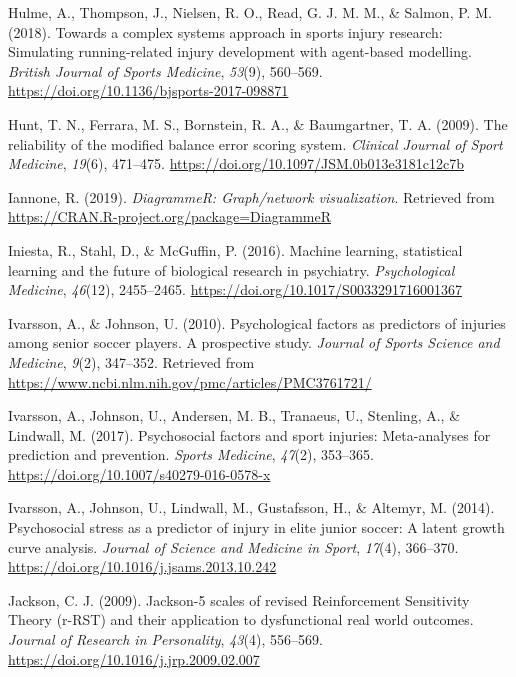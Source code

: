 \documentclass[
  english,
  man,floatsintext]{apa6}
\begin{document}
\leavevmode\hypertarget{ref-Hulme2018}{}%
Hulme, A., Thompson, J., Nielsen, R. O., Read, G. J. M. M., \& Salmon, P. M. (2018). Towards a complex systems approach in sports injury research: Simulating running-related injury development with agent-based modelling. \emph{British Journal of Sports Medicine}, \emph{53}(9), 560--569. \url{https://doi.org/10.1136/bjsports-2017-098871}

\leavevmode\hypertarget{ref-Hunt2009}{}%
Hunt, T. N., Ferrara, M. S., Bornstein, R. A., \& Baumgartner, T. A. (2009). The reliability of the modified balance error scoring system. \emph{Clinical Journal of Sport Medicine}, \emph{19}(6), 471--475. \url{https://doi.org/10.1097/JSM.0b013e3181c12c7b}

\leavevmode\hypertarget{ref-R-DiagrammeR}{}%
Iannone, R. (2019). \emph{DiagrammeR: Graph/network visualization}. Retrieved from \url{https://CRAN.R-project.org/package=DiagrammeR}

\leavevmode\hypertarget{ref-Iniesta2016}{}%
Iniesta, R., Stahl, D., \& McGuffin, P. (2016). Machine learning, statistical learning and the future of biological research in psychiatry. \emph{Psychological Medicine}, \emph{46}(12), 2455--2465. \url{https://doi.org/10.1017/S0033291716001367}

\leavevmode\hypertarget{ref-Ivarsson2010}{}%
Ivarsson, A., \& Johnson, U. (2010). Psychological factors as predictors of injuries among senior soccer players. A prospective study. \emph{Journal of Sports Science and Medicine}, \emph{9}(2), 347--352. Retrieved from \url{https://www.ncbi.nlm.nih.gov/pmc/articles/PMC3761721/}

\leavevmode\hypertarget{ref-Ivarsson2017}{}%
Ivarsson, A., Johnson, U., Andersen, M. B., Tranaeus, U., Stenling, A., \& Lindwall, M. (2017). Psychosocial factors and sport injuries: Meta-analyses for prediction and prevention. \emph{Sports Medicine}, \emph{47}(2), 353--365. \url{https://doi.org/10.1007/s40279-016-0578-x}

\leavevmode\hypertarget{ref-Ivarsson2014}{}%
Ivarsson, A., Johnson, U., Lindwall, M., Gustafsson, H., \& Altemyr, M. (2014). Psychosocial stress as a predictor of injury in elite junior soccer: A latent growth curve analysis. \emph{Journal of Science and Medicine in Sport}, \emph{17}(4), 366--370. \url{https://doi.org/10.1016/j.jsams.2013.10.242}

\leavevmode\hypertarget{ref-Jackson2009}{}%
Jackson, C. J. (2009). Jackson-5 scales of revised Reinforcement Sensitivity Theory (r-RST) and their application to dysfunctional real world outcomes. \emph{Journal of Research in Personality}, \emph{43}(4), 556--569. \url{https://doi.org/10.1016/j.jrp.2009.02.007}
\end{document}

